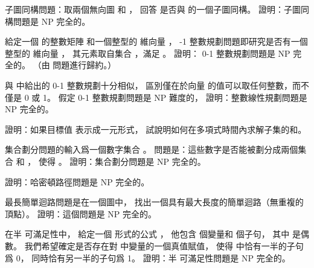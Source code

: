 \startsection[
  title={NP-complete problems},
]

\startEXERCISE
{\EMP 子圖同構問題}：取兩個無向圖  和 ，
回答  是否與  的一個子圖同構。
證明：子圖同構問題是 NP 完全的。
\stopEXERCISE

\startANSWER
{}
\stopANSWER

\startEXERCISE
給定一個  的整數矩陣  和一個整型的  維向量 ，
 {-1 整數規劃問題}即研究是否有一個整型的  維向量 ，
其元素取自集合 ，滿足 。
證明： 0-1 整數規劃問題是 NP 完全的。
（\hint 由  問題進行歸約。）
\stopEXERCISE

\startANSWER
{}
\stopANSWER

與 中給出的 0-1 整數規劃十分相似，
區別僅在於向量  的值可以取任何整數，而不僅是 0 或 1。
假定 0-1 整數規劃問題是 NP 難度的，
證明：整數線性規劃問題是 NP 完全的。
\stopEXERCISE

\startANSWER
{}
\stopANSWER

\startEXERCISE
證明：如果目標值  表示成一元形式，
試說明如何在多項式時間內求解子集的和。
\stopEXERCISE

\startANSWER
{}
\stopANSWER

\startEXERCISE
{\EMP 集合劃分問題}的輸入爲一個數字集合 。
問題是：這些數字是否能被劃分成兩個集合  和 ，
使得 。
證明：集合劃分問題是 NP 完全的。
\stopEXERCISE

\startANSWER
{}
\stopANSWER

\startEXERCISE
證明：哈密頓路徑問題是 NP 完全的。
\stopEXERCISE

\startANSWER
{}
\stopANSWER

\startEXERCISE
{\EMP 最長簡單迴路問題}是在一個圖中，
找出一個具有最大長度的簡單迴路（無重複的頂點）。
證明：這個問題是 NP 完全的。
\stopEXERCISE

\startANSWER
{}
\stopANSWER

\startEXERCISE
在{\EMP 半  可滿足性}中，
給定一個  形式的公式 \m{\phi}，
他包含  個變量和  個子句，
其中  是偶數。
我們希望確定是否存在對 \m{\phi} 中變量的一個真值賦值，
使得 \m{\phi} 中恰有一半的子句爲 0，
同時恰有另一半的子句爲 1。
證明：半  可滿足性問題是 NP 完全的。
\stopEXERCISE

\startANSWER
{}
\stopANSWER

\stopsection
